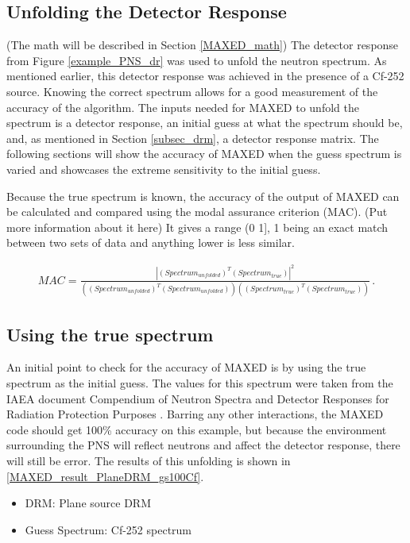 \subsection{Unfolding the Detector Response}
(The math will be described in Section \ref{MAXED_math})
The detector response from Figure \ref{example_PNS_dr} was used to unfold the neutron spectrum. As mentioned earlier, this detector response was achieved in the presence of a Cf-252 source. Knowing the correct spectrum allows for a good measurement of the accuracy of the algorithm.
The inputs needed for MAXED to unfold the spectrum is a detector response, an initial guess at what the spectrum should be, and, as mentioned in Section \ref{subsec_drm}, a detector response matrix. The following sections will show the accuracy of MAXED when the guess spectrum is varied and showcases the extreme sensitivity to the initial guess.

Because the true spectrum is known, the accuracy of the output of MAXED can be calculated and compared using the modal assurance criterion (MAC). (Put more information about it here) It gives a range (0 1], 1 being an exact match between two sets of data and anything lower is less similar.

\begin{align}\label{eq:MAC}
MAC = \frac{|(Spectrum_{unfolded})^T(Spectrum_{true})|^2}{((Spectrum_{unfolded})^T(Spectrum_{unfolded}))((Spectrum_{true})^T(Spectrum_{true}))} \,.
\end{align}

\subsection*{Using the true spectrum}
An initial point to check for the accuracy of MAXED is by using the true spectrum as the initial guess. The values for this spectrum were taken from the IAEA document Compendium of Neutron Spectra and Detector Responses for Radiation Protection Purposes \cite{iaea_spec}. Barring any other interactions, the MAXED code should get 100\% accuracy on this example, but because the environment surrounding the PNS will reflect neutrons and affect the detector response, there will still be error. The results of this unfolding is shown in \ref{MAXED_result_PlaneDRM_gs100Cf}.
\begin{itemize}
\item DRM: Plane source DRM
\item Guess Spectrum: Cf-252 spectrum
\end{itemize}

